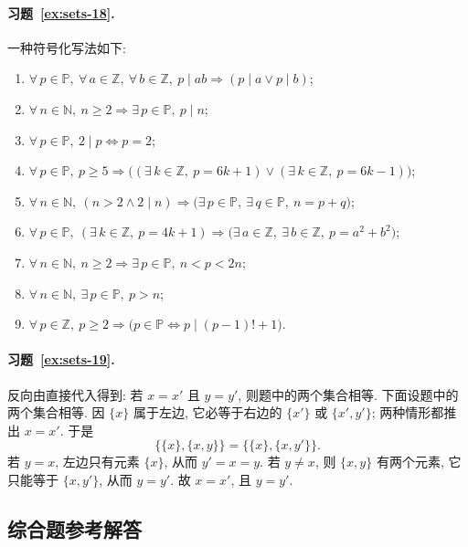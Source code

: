 \documentclass[usesamecnt, thmcnt=section, lang=cn, newtx, 10pt, scheme=chinese]{elegantbook}
\begin{document}
\paragraph*{习题~\ref{ex:sets-18}.}
一种符号化写法如下:
\begin{enumerate}[label=\rm(\arabic*)]
  \item $\forall\,p\in\mathbb P,\ \forall\,a\in\mathbb Z,\ \forall\,b\in\mathbb Z,\ p\mid ab\Rightarrow(p\mid a\vee p\mid b)$;
  \item $\forall\,n\in\mathbb N,\ n\geq2\Rightarrow\exists\,p\in\mathbb P,\ p\mid n$;
  \item $\forall\,p\in\mathbb P,\ 2\mid p\Leftrightarrow p=2$;
  \item $\forall\,p\in\mathbb P,\ p\geq5\Rightarrow\bigl((\exists\,k\in\mathbb Z,\ p=6k+1)\vee(\exists\,k\in\mathbb Z,\ p=6k-1)\bigr)$;
  \item $\forall\,n\in\mathbb N,\ (n>2\wedge2\mid n)\Rightarrow\bigl(\exists\,p\in\mathbb P,\ \exists\,q\in\mathbb P,\ n=p+q\bigr)$;
  \item $\forall\,p\in\mathbb P,\ (\exists\,k\in\mathbb Z,\ p=4k+1)\Rightarrow\bigl(\exists\,a\in\mathbb Z,\ \exists\,b\in\mathbb Z,\ p=a^2+b^2\bigr)$;
  \item $\forall\,n\in\mathbb N,\ n\geq2\Rightarrow\exists\,p\in\mathbb P,\ n<p<2n$;
  \item $\forall\,n\in\mathbb N,\ \exists\,p\in\mathbb P,\ p>n$;
  \item $\forall\,p\in\mathbb Z,\ p\geq2\Rightarrow\bigl(p\in\mathbb P\Leftrightarrow p\mid(p-1)!+1\bigr)$.
\end{enumerate}

\paragraph*{习题~\ref{ex:sets-19}.}
反向由直接代入得到: 若 $x=x'$ 且 $y=y'$, 则题中的两个集合相等. 下面设题中的两个集合相等. 因 $\{x\}$ 属于左边, 它必等于右边的 $\{x'\}$ 或 $\{x',y'\}$; 两种情形都推出 $x=x'$. 于是
\[
 \{\{x\},\{x,y\}\}=\{\{x\},\{x,y'\}\}.
\]
若 $y=x$, 左边只有元素 $\{x\}$, 从而 $y'=x=y$. 若 $y\neq x$, 则 $\{x,y\}$ 有两个元素, 它只能等于 $\{x,y'\}$, 从而 $y=y'$. 故 $x=x'$, 且 $y=y'$.

\subsection*{综合题参考解答}
\end{document}
